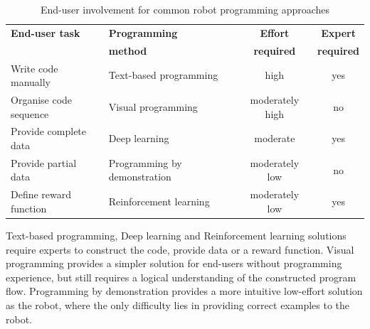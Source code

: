\begin{table}[ht]
	\centering
	\label{tab:end-user involvement}
	\begin{tabular}{llcc}
		\textbf{End-user task} & \textbf{Programming}   & \textbf{Effort} & \textbf{Expert} \\
		\textbf{}& \textbf{method}   & \textbf{ required} & \textbf{ required} \\ \hline
		Write code manually    & Text-based programming       & high                          & yes                      \\
		Organise code sequence & Visual programming           & moderately high               & no                       \\
		Provide complete data  & Deep learning                & moderate                      & yes                      \\
		Provide partial data   & Programming by demonstration & moderately low                & no                       \\
		Define reward function & Reinforcement learning       & moderately low                & yes                     
	\end{tabular}
\caption{End-user involvement for common robot programming approaches}
\end{table}

Text-based programming, Deep learning and Reinforcement learning solutions require experts to construct the code, provide data or a reward function. Visual programming provides a simpler solution for end-users without programming experience, but still requires a logical understanding of the constructed program flow. Programming by demonstration provides a more intuitive low-effort solution as the robot, where the only difficulty lies in providing correct examples to the robot.


